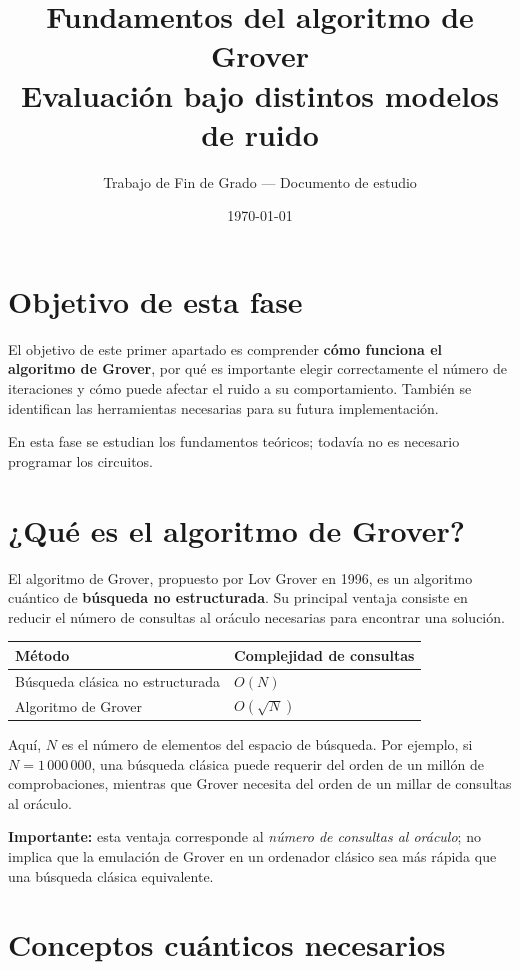 \documentclass[11pt,a4paper]{article}
\title{Fundamentos del algoritmo de Grover\\[2mm]
\large Evaluación bajo distintos modelos de ruido}
\author{Trabajo de Fin de Grado --- Documento de estudio}
\date{\today}
\begin{document}
\maketitle
\tableofcontents
\bigskip

\section{Objetivo de esta fase}

El objetivo de este primer apartado es comprender \textbf{cómo funciona el algoritmo de Grover}, por qué es importante elegir correctamente el número de iteraciones y cómo puede afectar el ruido a su comportamiento. También se identifican las herramientas necesarias para su futura implementación.

En esta fase se estudian los fundamentos teóricos; todavía no es necesario programar los circuitos.

\section{¿Qué es el algoritmo de Grover?}

El algoritmo de Grover, propuesto por Lov Grover en 1996, es un algoritmo cuántico de \textbf{búsqueda no estructurada}. Su principal ventaja consiste en reducir el número de consultas al oráculo necesarias para encontrar una solución.

\begin{center}
\begin{tabular}{ll}
\toprule
\textbf{Método} & \textbf{Complejidad de consultas} \\
\midrule
Búsqueda clásica no estructurada & $O(N)$ \\
Algoritmo de Grover & $O(\sqrt{N})$ \\
\bottomrule
\end{tabular}
\end{center}

Aquí, $N$ es el número de elementos del espacio de búsqueda. Por ejemplo, si $N=1\,000\,000$, una búsqueda clásica puede requerir del orden de un millón de comprobaciones, mientras que Grover necesita del orden de un millar de consultas al oráculo.

\textbf{Importante:} esta ventaja corresponde al \emph{número de consultas al oráculo}; no implica que la emulación de Grover en un ordenador clásico sea más rápida que una búsqueda clásica equivalente.

\section{Conceptos cuánticos necesarios}
\end{document}
